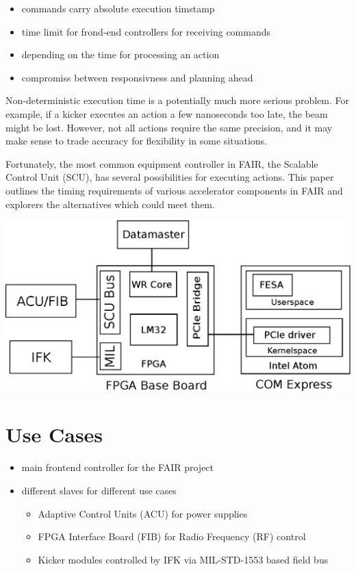 \documentclass[25pt,halfparskip-,pagesize]{scrartcl}
\begin{document}
\begin{multicols*}{3}
\begin{itemize}
  \item commands carry absolute execution timstamp
  \item time limit for frond-end controllers for receiving commands
  \item depending on the time for processing an action
  \item compromiss between responsivness and planning ahead
\end{itemize}


Non-deterministic execution time is a potentially much more serious problem.
For example, if a kicker executes an action a few nanoseconds too late,
the beam might be lost.
However, not all actions require the same precision,
and it may make sense to trade accuracy for flexibility in some situations.

Fortunately, the  most common equipment controller in FAIR,
the Scalable Control Unit (SCU),
has several possibilities for executing actions.
This paper outlines the timing requirements of various accelerator
components in FAIR and explorers the alternatives which could meet them.




\includegraphics[width=\columnwidth]{../images/WEPD48f2}
\label{fig:block_diagram}

\section{Use Cases}
\begin{itemize}
	\item main frontend controller for the FAIR project
        \item different slaves for different use cases
        \begin{itemize} 
	  \item Adaptive Control Units (ACU) for power supplies
          \item FPGA Interface Board (FIB) for Radio Frequency (RF) control
          \item Kicker modules controlled by IFK via MIL-STD-1553 based field bus
        \end{itemize}
\end{itemize}


\end{multicols*}
\end{document}
